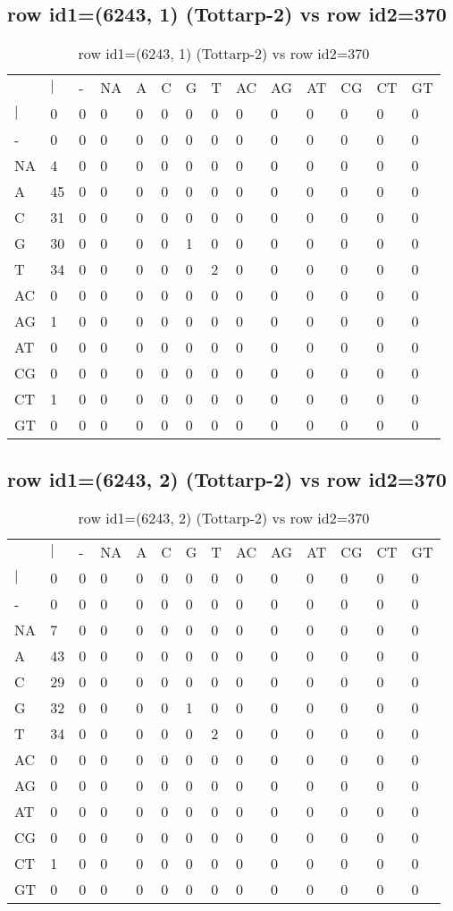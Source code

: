 \subsection{row id1=(6243, 1) (Tottarp-2) vs row id2=370}
\begin{center}
\begin{longtable}{|l|l|l|l|l|l|l|l|l|l|l|l|l|l|}
\caption{row id1=(6243, 1) (Tottarp-2) vs row id2=370} \label{table_dm48}\\
\hline
\\
\hline
&$|$&-&NA&A&C&G&T&AC&AG&AT&CG&CT&GT\\
$|$&0&0&0&0&0&0&0&0&0&0&0&0&0\\
-&0&0&0&0&0&0&0&0&0&0&0&0&0\\
NA&4&0&0&0&0&0&0&0&0&0&0&0&0\\
A&45&0&0&0&0&0&0&0&0&0&0&0&0\\
C&31&0&0&0&0&0&0&0&0&0&0&0&0\\
G&30&0&0&0&0&1&0&0&0&0&0&0&0\\
T&34&0&0&0&0&0&2&0&0&0&0&0&0\\
AC&0&0&0&0&0&0&0&0&0&0&0&0&0\\
AG&1&0&0&0&0&0&0&0&0&0&0&0&0\\
AT&0&0&0&0&0&0&0&0&0&0&0&0&0\\
CG&0&0&0&0&0&0&0&0&0&0&0&0&0\\
CT&1&0&0&0&0&0&0&0&0&0&0&0&0\\
GT&0&0&0&0&0&0&0&0&0&0&0&0&0\\
\hline
\end{longtable}
\end{center}

\subsection{row id1=(6243, 2) (Tottarp-2) vs row id2=370}
\begin{center}
\begin{longtable}{|l|l|l|l|l|l|l|l|l|l|l|l|l|l|}
\caption{row id1=(6243, 2) (Tottarp-2) vs row id2=370} \label{table_dm50}\\
\hline
\\
\hline
&$|$&-&NA&A&C&G&T&AC&AG&AT&CG&CT&GT\\
$|$&0&0&0&0&0&0&0&0&0&0&0&0&0\\
-&0&0&0&0&0&0&0&0&0&0&0&0&0\\
NA&7&0&0&0&0&0&0&0&0&0&0&0&0\\
A&43&0&0&0&0&0&0&0&0&0&0&0&0\\
C&29&0&0&0&0&0&0&0&0&0&0&0&0\\
G&32&0&0&0&0&1&0&0&0&0&0&0&0\\
T&34&0&0&0&0&0&2&0&0&0&0&0&0\\
AC&0&0&0&0&0&0&0&0&0&0&0&0&0\\
AG&0&0&0&0&0&0&0&0&0&0&0&0&0\\
AT&0&0&0&0&0&0&0&0&0&0&0&0&0\\
CG&0&0&0&0&0&0&0&0&0&0&0&0&0\\
CT&1&0&0&0&0&0&0&0&0&0&0&0&0\\
GT&0&0&0&0&0&0&0&0&0&0&0&0&0\\
\hline
\end{longtable}
\end{center}

